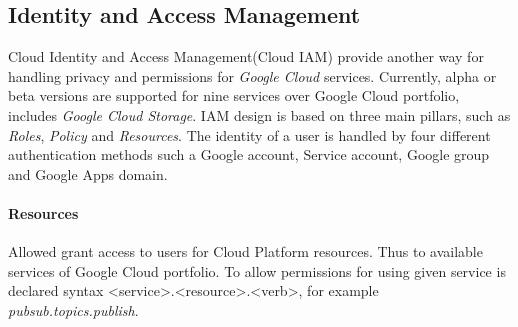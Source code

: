 \documentclass[a4paper,12pt,oneside]{report}
\begin{document}
        



\subsection{Identity and Access Management}
Cloud Identity and Access Management(Cloud IAM) provide another way for handling privacy 
and permissions for \textit{Google Cloud} services. Currently, alpha  or beta versions are 
supported for nine services over Google Cloud portfolio, 
includes \textit{Google Cloud Storage}. IAM design is based on three main pillars, 
such as \textit{Roles}, \textit{Policy} and \textit{Resources}. The 
identity of a user is handled by four different authentication methods such a Google 
account, Service account, Google group and Google Apps domain.

\paragraph{Resources} Allowed grant access to users for Cloud Platform resources. Thus 
to available services of Google Cloud portfolio. To allow permissions for using given 
service is declared syntax \textless service\textgreater.\textless resource\textgreater.\textless verb\textgreater, for example \emph{pubsub.topics.publish}.
\end{document}
